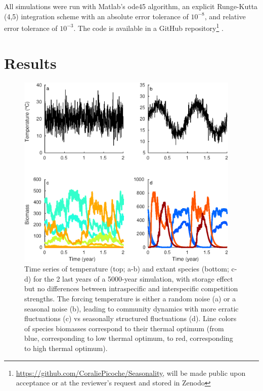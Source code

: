 \documentclass[smallcondensed,referee]{svjour3}       %
\begin{document}
All simulations were run with Matlab's ode45 algorithm, an explicit
Runge-Kutta (4,5) integration scheme with an absolute error tolerance
of $10^{-8}$, and relative error tolerance of $10^{-3}$. The code
is available in a GitHub repository\footnote{\url{https://github.com/CoraliePicoche/Seasonality}, will be made
public upon acceptance or at the reviewer's request and stored in
Zenodo} .
 
\section*{Results}

\begin{figure}[!ht]
\begin{centering}
\includegraphics[width=0.95\textwidth]{Fig1}
\par\end{centering}
\caption{Time series of temperature (top; a-b) and extant species (bottom;
c-d) for the 2 last years of a 5000-year simulation, with storage
effect but no differences between intraspecific and interspecific
competition strengths. The forcing temperature is either a random
noise (a) or a seasonal noise (b), leading to community dynamics with
more erratic fluctuations (c) vs seasonally structured fluctuations
(d). Line colors of species biomasses correspond to their thermal
optimum (from blue, corresponding to low thermal optimum, to red,
corresponding to high thermal optimum).\label{fig:Times-series_temperature_species}}
\end{figure}
\end{document}
